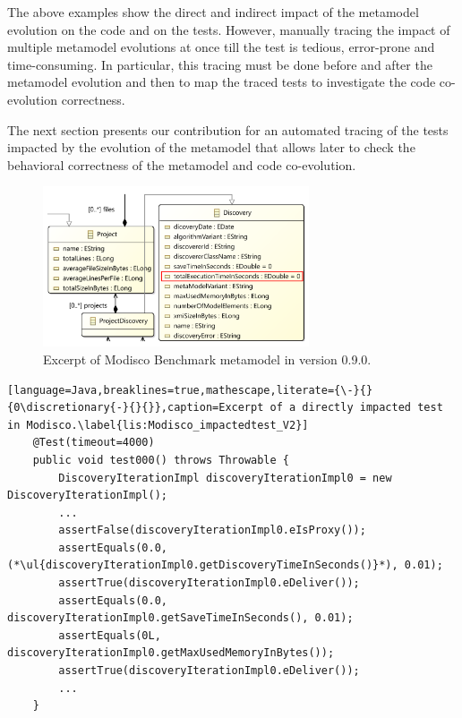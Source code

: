 {	The above examples show the direct and indirect impact of the metamodel evolution on the code and on the tests. However, manually tracing the impact of multiple metamodel evolutions at once till the test is tedious, error-prone and time-consuming. In particular, this tracing must be done before and after the metamodel evolution and then to map the traced tests to investigate the code co-evolution correctness. 
	
	The next section presents our contribution for an automated tracing of the tests impacted by the evolution of the metamodel that allows later to check the behavioral correctness of the metamodel and code co-evolution. 
	
}


\begin{figure}[tb]
	\centering
	\includegraphics[width=0.7\textwidth]{./pics/chapter2pics/excerptmodisco.png}
	
	\caption{Excerpt of Modisco Benchmark metamodel in version 0.9.0.}
	\label{fig:excerptmodisco}
\end{figure}





\begin{lstlisting}[language=Java,breaklines=true,mathescape,literate={\-}{}{0\discretionary{-}{}{}},caption=Excerpt of a directly impacted test in Modisco.\label{lis:Modisco_impactedtest_V2}]
	@Test(timeout=4000)
	public void test000() throws Throwable {
		DiscoveryIterationImpl discoveryIterationImpl0 = new DiscoveryIterationImpl();
		...
		assertFalse(discoveryIterationImpl0.eIsProxy());
		assertEquals(0.0,  (*\ul{discoveryIterationImpl0.getDiscoveryTimeInSeconds()}*), 0.01);
		assertTrue(discoveryIterationImpl0.eDeliver());
		assertEquals(0.0, discoveryIterationImpl0.getSaveTimeInSeconds(), 0.01);
		assertEquals(0L, discoveryIterationImpl0.getMaxUsedMemoryInBytes());
		assertTrue(discoveryIterationImpl0.eDeliver());
		...
	}
	
	
\end{lstlisting}

